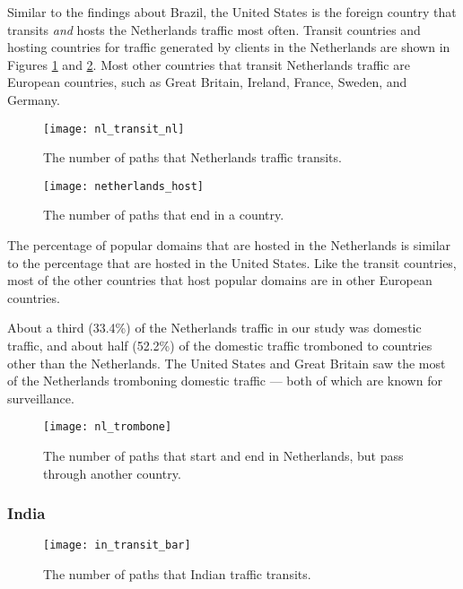 Similar to the findings about Brazil, the United States is the foreign country that transits {\it and} hosts the Netherlands traffic most often.  Transit countries and hosting countries for traffic generated by clients in the Netherlands are shown in Figures \ref{fig:transit_nl} and \ref{fig:host_nl}.  Most other countries that transit Netherlands traffic are European countries, such as Great Britain, Ireland, France, Sweden, and Germany.

\begin{figure}
\centering
\texttt{[image: nl\_transit\_nl]}
\caption{The number of paths that Netherlands traffic transits.}
\label{fig:transit_nl}
\end{figure}

\begin{figure}[t!]
\centering
\texttt{[image: netherlands\_host]}
\caption{The number of paths that end in a country.}
\label{fig:host_nl}
\end{figure} 

The percentage of popular domains that are hosted in the Netherlands is similar to the percentage that are hosted in the United States.  Like the transit countries, most of the other countries that host popular domains are in other European countries.

About a third (33.4\%) of the Netherlands traffic in our study was domestic traffic, and about half (52.2\%) of the domestic traffic tromboned to countries other than the Netherlands.  The United States and Great Britain saw the most of the Netherlands tromboning domestic traffic --- both of which are known for surveillance.

\begin{figure}
\centering
\texttt{[image: nl\_trombone]}
\caption{The number of paths that start and end in Netherlands, but pass through another country.}
\label{fig:trombone_nl}
\end{figure}

\subsubsection{India}

\begin{figure}
\centering
\texttt{[image: in\_transit\_bar]}
\caption{The number of paths that Indian traffic transits.}
\label{fig:transit_in}
\end{figure}

